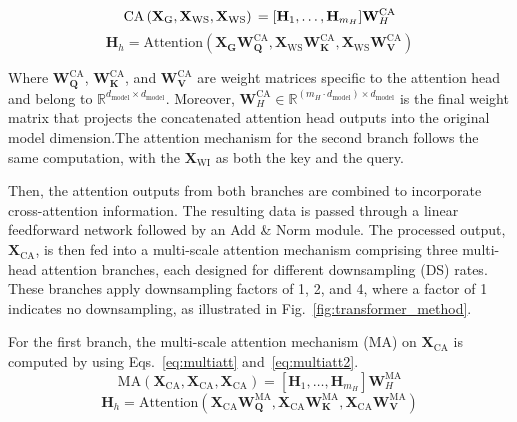 \begin{equation}
        \text{CA}\left(\mathbf{X_\text{G}}, \mathbf{X_{\text{WS}}}, \mathbf{X_{\text{WS}}}\right) \\
         =[\mathbf{H}_1, \dots, \mathbf{H}_{m_H}] \mathbf{W}_H^{\text{CA}}
    \label{eq:crossatt}
\end{equation}
\begin{equation}
    \mathbf{H}_h = \text{Attention}(\mathbf{\mathbf{X_\text{G}}} \mathbf{W}_{\mathbf{Q}}^{\text{CA}}, \mathbf{X}_\text{WS} \mathbf{W}_{\mathbf{K}}^{\text{CA}}, \mathbf{X}_\text{WS} \mathbf{W}_{\mathbf{V}}^{\text{CA}})
    \label{eq:crossatt2}
\end{equation}

Where $\mathbf{W}_{\mathbf{Q}}^{\text{CA}}$, $\mathbf{W}_{\mathbf{K}}^{\text{CA}}$, and  $\mathbf{W}_{\mathbf{V}}^{\text{CA}}$ are weight matrices specific to the attention head and belong to $\mathbb{R} ^{d_{\text{model}}\times d_{\text{model}}}$. Moreover, $\mathbf{W}_H^{\text{CA}} \in \mathbb{R}^{(m_H \cdot d_{\text{model}}) \times d_{\text{model}}}$ is the final weight matrix that projects the concatenated attention head outputs into the original model dimension.The attention mechanism for the second branch follows the same computation, with the $\mathbf{X}_\text{WI}$ as both the key and the query.

Then, the attention outputs from both branches are combined to incorporate cross-attention information. The resulting data is passed through a linear feedforward network followed by an Add \& Norm module. The processed output, \( \mathbf{X}_{\text{CA}} \), is then fed into a multi-scale attention mechanism comprising three multi-head attention branches, each designed for different downsampling (DS) rates. These branches apply downsampling factors of 1, 2, and 4, where a factor of 1 indicates no downsampling, as illustrated in Fig.~\ref{fig:transformer_method}.

For the first branch, the multi-scale attention mechanism (MA) on $\mathbf{X}_{\text{CA}}$ is computed by using Eqs.~\ref{eq:multiatt} and~\ref{eq:multiatt2}.
\begin{equation}
        \text{MA}(\mathbf{X}_\text{CA}, \mathbf{X}_\text{CA}, \mathbf{X}_\text{CA}) =
        [\mathbf{H}_1, \dots, \mathbf{H}_{m_H}] \mathbf{W}_H^{\text{MA}}
    \label{eq:multiatt}
\end{equation}
\begin{equation}
    \mathbf{H}_h = \text{Attention}(\mathbf{X}_\text{CA} \mathbf{W}_{\mathbf{Q}}^{\text{MA}},\mathbf{X}_\text{CA} \mathbf{W}_{\mathbf{K}}^{\text{MA}}, \mathbf{X}_\text{CA} \mathbf{W}_{\mathbf{V}}^{\text{MA}})
    \label{eq:multiatt2}
\end{equation}


